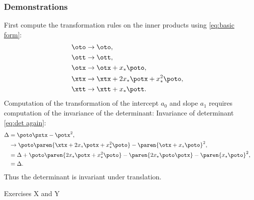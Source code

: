 \subsubsection{Demonstrations}  %
First compute the transformation rules on the inner products using \eqref{eq:basic form}:
  \begin{equation}   %
    \begin{split}
      \oto &\rightarrow \oto, \\
      \ott &\rightarrow \ott, \\
      \otx &\rightarrow \otx + x_{*} \poto, \\
      \xtx &\rightarrow \xtx + 2x_{*} \potx + x_{*}^{2} \poto, \\
      \xtt &\rightarrow \xtt + x_{*} \pott.
     \label{eq:translation:dot products}
     \end{split}
  \end{equation}
Computation of the transformation of the intercept $a_{0}$ and slope $a_{1}$ requires computation of the invariance of the determinant:
Invariance of determinant \eqref{eq:det again}:
  \begin{equation*}   %
    \begin{split}
      \Delta 
        &= \poto \pxtx - \potx^{2} , \\
        &\rightarrow \poto \paren{\xtx + 2x_{*} \potx + x_{*}^{2} \poto} - \paren{\otx + x_{*} \poto}^{2} , \\
        &= \Delta + \poto \paren{2x_{*} \potx + x_{*}^{2} \poto} - \paren{2x_{*} \poto\potx} - \paren{x_{*}\poto}^{2} , \\
        &= \Delta.
    \end{split}
  \end{equation*}
Thus the determinant is invariant under translation.

Exercises X and Y

